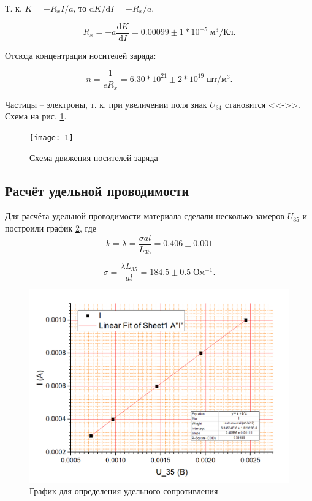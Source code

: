 \documentclass[a4paper]{article}
\begin{document}
Т. к. $ K = -R_x I / a$, то $ \mathrm{d} K /\mathrm{d} I = -R_x / a $. 

\begin{equation}\label{5}
	R_x = - a \frac{\mathrm{d} K}{\mathrm{d} I} = 0.00099 \pm 1*10^{-5}\; м^3/Кл.
\end{equation}

Отсюда концентрация носителей заряда:

\begin{equation}\label{6}
	n = \frac{1}{e R_x} = 6.30*10^{21} \pm 2 * 10^{19}\; шт/м^3.
\end{equation}

Частицы -- электроны, т. к. при увеличении поля знак $ U_{3 4} $ становится <<->>. Схема на рис. \ref{fig:1}.

\begin{figure}
	\centering
	\texttt{[image: 1]}
	\caption{Схема движения носителей заряда}
	\label{fig:1}
\end{figure}

\subsection{Расчёт удельной проводимости}

Для расчёта удельной проводимости материала сделали несколько замеров $ U_{3 5} $ и построили график \ref{fig:уд}, где
\begin{equation}\label{7}
	k = \lambda = \frac{\sigma a l}{L_{3 5}} = 0.406 \pm 0.001
\end{equation}

\begin{equation}\label{8}
	\sigma = \frac{\lambda L_{3 5}}{a l} = 184.5 \pm 0.5 \; Ом^{-1}.
\end{equation}

\begin{figure}
	\centering
	\includegraphics[width=0.8\linewidth]{удсопр}
	\caption{График для определения удельного сопротивления}
	\label{fig:уд}
\end{figure}
\end{document}
